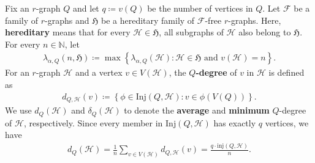 \documentclass[11pt,a4paper]{article}
\begin{document}
Fix an $r$-graph $Q$ and let $q \coloneqq v(Q)$ be the number of vertices in $Q$. 
Let $\mathcal{F}$ be a family of $r$-graphs and $\mathfrak{H}$ be a hereditary family of $\mathcal{F}$-free $r$-graphs. 
Here, \textbf{hereditary} means that for every $\mathcal{H} \in \mathfrak{H}$, all subgraphs of $\mathcal{H}$ also belong to $\mathfrak{H}$. 
For every $n \in \mathbb{N}$, let 
\begin{align*}
    \lambda_{\alpha, Q}(n, \mathfrak{H})
    \coloneqq \max\left\{\lambda_{\alpha, Q}(\mathcal{H}) \colon \text{$\mathcal{H} \in \mathfrak{H}$ and $v(\mathcal{H}) = n$}\right\}.
\end{align*}
%
For an $r$-graph $\mathcal{H}$ and a vertex $v\in V(\mathcal{H})$, the \textbf{$Q$-degree} of $v$ in $\mathcal{H}$ is defined as 
\begin{align*}
    d_{Q,\mathcal{H}}(v)
    \coloneqq \left\{\phi \in \mathrm{Inj}(Q,\mathcal{H}) \colon v\in \phi(V(Q))\right\}. 
\end{align*}
%
We use $d_{Q}(\mathcal{H})$ and $\delta_{Q}(\mathcal{H})$ to denote the \textbf{average} and \textbf{minimum} $Q$-degree of $\mathcal{H}$, respectively.
Since every member in $\mathrm{Inj}(Q, \mathcal{H})$ has exactly $q$ vertices, we have  
\begin{align*}
    d_{Q}(\mathcal{H})
    = \frac{1}{n} \sum_{v\in V(\mathcal{H})} d_{Q,\mathcal{H}}(v)
    = \frac{q \cdot \mathrm{inj}(Q, \mathcal{H})}{n}. 
\end{align*}
\end{document}
